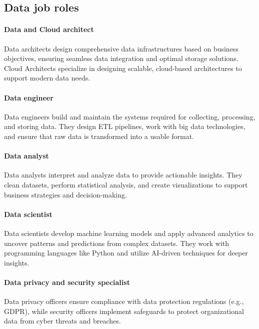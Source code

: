 \subsection{Data job roles}

\paragraph*{Data and Cloud architect}
Data architects design comprehensive data infrastructures based on business objectives, ensuring seamless data integration and optimal storage solutions. 
Cloud Architects specialize in designing scalable, cloud-based architectures to support modern data needs.

\paragraph*{Data engineer}
Data engineers build and maintain the systems required for collecting, processing, and storing data. 
They design ETL pipelines, work with big data technologies, and ensure that raw data is transformed into a usable format.

\paragraph*{Data analyst}
Data analysts interpret and analyze data to provide actionable insights. 
They clean datasets, perform statistical analysis, and create visualizations to support business strategies and decision-making.

\paragraph*{Data scientist}
Data scientists develop machine learning models and apply advanced analytics to uncover patterns and predictions from complex datasets. 
They work with programming languages like Python and utilize AI-driven techniques for deeper insights.

\paragraph*{Data privacy and security specialist}
Data privacy officers ensure compliance with data protection regulations (e.g., GDPR), while security officers implement safeguards to protect organizational data from cyber threats and breaches.

